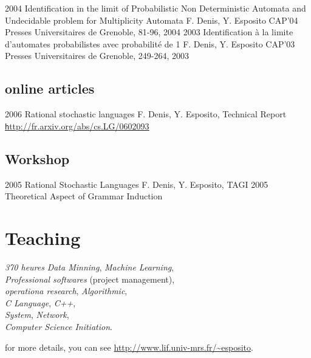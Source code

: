 \article
{2004}
{Identification in the limit of Probabilistic Non Deterministic Automata and Undecidable problem for Multiplicity Automata}
{F. Denis, Y. Esposito}
{CAP'04}
{Presses Universitaires de Grenoble, 81-96, 2004}
\article
{2003}
{Identification à la limite d'automates probabilistes avec probabilité de 1}
{F. Denis, Y. Esposito}
{CAP'03}
{Presses Universitaires de Grenoble, 249-264, 2003}

\subsection*{online articles}

\article
{2006}
{Rational stochastic languages}
{ F. Denis, Y. Esposito,}
{Technical Report}
{\href{http://fr.arxiv.org/abs/cs.LG/0602093}{\texttt http\string://fr.arxiv.org/abs/cs.LG/0602093}}

\subsection*{Workshop}

\article
{2005}
{Rational Stochastic Languages}
{F. Denis, Y. Esposito,}
{TAGI 2005}
{Theoretical Aspect of Grammar Induction}

\section*{Teaching}

{\emph{370 heures}}
{\emph{Data Minning}, \emph{Machine Learning},\\
\emph{Professional softwares} (project management),\\
\emph{operationa research}, \emph{Algorithmic},\\
\emph{C Language}, \emph{C++},\\
\emph{System}, \emph{Network},\\
\emph{Computer Science Initiation}.
}

\footnotesize{
    for more details, you can see
    \href{http://www.lif.univ-mrs.fr/~esposito}
    {http://www.lif.univ-mrs.fr/\textasciitilde{}esposito}.
}



